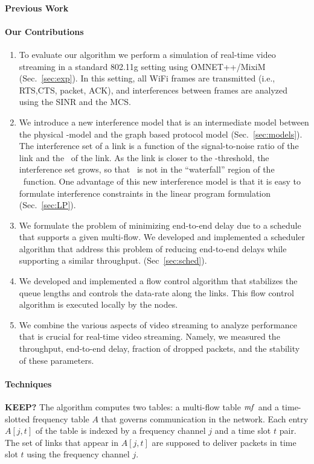 \documentclass[12pt]{article}
\newenvironment{proof sketch}[1]{\noindent {\emph{Proof sketch of #1:}}}{\hfill \qed}
\newcommand{\SINR}{\text{\sc{sinr}}}
\newcommand{\PER}{\text{\sc{per}}}
\newcommand{\mf}{\text{\emph{mf}}}
\newcommand{\MCS}{\text{\sc{mcs}}}
\begin{document}
\paragraph{Previous Work}

\paragraph{Our Contributions}
\begin{enumerate}
\item To evaluate our algorithm we perform a simulation of real-time
  video streaming in a standard 802.11g setting using OMNET++/MixiM
  (Sec.~\ref{sec:exp}).  In this setting, all WiFi frames are
  transmitted (i.e., RTS,CTS, packet, ACK), and interferences between
  frames are analyzed using the SINR and the MCS.
\item We introduce a new interference model that is an intermediate
  model between the physical \SINR-model and the graph based protocol
  model (Sec.~\ref{sec:models}). The interference set of a link is a
  function of the signal-to-noise ratio of the link and the \MCS\ of
  the link.  As the link is closer to the \SINR-threshold, the
  interference set grows, so that \SINR\ is not in the ``waterfall''
  region of the \PER\ function.  One advantage of this new
  interference model is that it is easy to formulate interference
  constraints in the linear program formulation (Sec.~\ref{sec:LP}).
\item We formulate the problem of minimizing end-to-end delay due to a
  schedule that supports a given multi-flow. We developed and
  implemented a scheduler algorithm that address this problem of
  reducing end-to-end delays while supporting a similar throughput.
  (Sec~\ref{sec:sched}).
\item We developed and implemented a flow control algorithm that
  stabilizes the queue lengths and controls the data-rate along the
  links.  This flow control algorithm is executed locally by the
  nodes.
\item We combine the various aspects of video streaming to analyze
  performance that is crucial for real-time video streaming.  Namely,
  we measured the throughput, end-to-end delay, fraction of dropped
  packets, and the stability of these parameters.
\end{enumerate}

\paragraph{Techniques}
\textbf{KEEP?}
The algorithm computes two tables: a multi-flow table $\mf$ and a
time-slotted frequency table $A$ that governs communication in the
network. Each entry $A[j,t]$ of the table is indexed by a frequency
channel $j$ and a time slot $t$ pair.  The set of links that appear in
$A[j,t]$ are supposed to deliver packets in time slot $t$ using the
frequency channel $j$.
\end{document}
